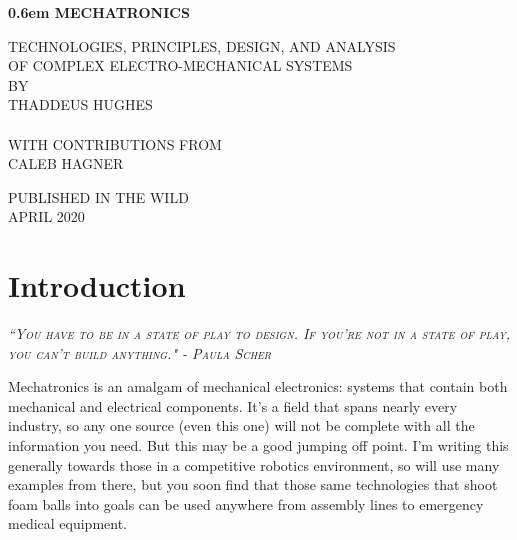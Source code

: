 \documentclass[10pt,letterpaper]{book}
\begin{document}
\clearpage
\newcommand\nbvspace[1][3]{\vspace*{\stretch{#1}}}
\newcommand\nbstretchyspace{\spaceskip0.5em plus 0.25em minus 0.25em}
\newcommand{\nbtitlestretch}{\spaceskip0.6em}
\pagestyle{plain}
\begin{center}
  \bfseries
  \nbvspace[1]
  \Huge
  {\nbtitlestretch\huge
    MECHATRONICS}

  \nbvspace[1]
  \normalsize
  TECHNOLOGIES, PRINCIPLES, DESIGN, AND ANALYSIS\\
  OF COMPLEX ELECTRO-MECHANICAL SYSTEMS\\
  
  \nbvspace[1]
  \small BY\\
  \Large THADDEUS HUGHES\\
  \ \\
  \tiny WITH CONTRIBUTIONS FROM\\
  \small CALEB HAGNER

  \nbvspace[2]

  \nbvspace[3]
  \normalsize

  \large
  PUBLISHED IN THE WILD \\
  \small APRIL 2020 \\
\end{center}


\raggedbottom

\tableofcontents

\chapter{Introduction}
 
 {\slshape \scshape ``You have to be in a state of play to design. If you're not in a state of play, you can't build anything." - Paula Scher}

Mechatronics is an amalgam of mechanical electronics: systems that contain both mechanical and electrical components. It's a field that spans nearly every industry, so any one source (even this one) will not be complete with all the information you need. But this may be a good jumping off point. I'm writing this generally towards those in a competitive robotics environment, so will use many examples from there, but you soon find that those same technologies that shoot foam balls into goals can be used anywhere from assembly lines to emergency medical equipment.
\end{document}
